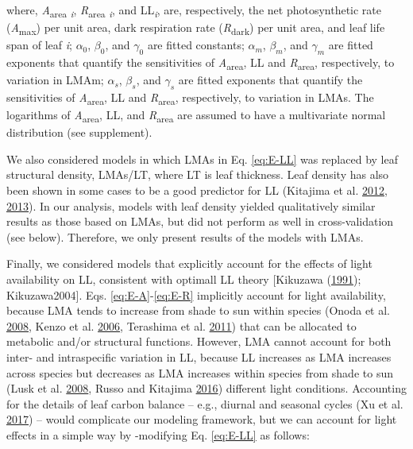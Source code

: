\documentclass[
  12pt,
]{article}
\begin{document}
where, \emph{A}\textsubscript{area} \textsubscript{\emph{i}}, \emph{R}\textsubscript{area} \textsubscript{\emph{i}}, and LL\textsubscript{\emph{i}}, are, respectively, the net photosynthetic rate (\emph{A}\textsubscript{max}) per unit area, dark respiration rate (\emph{R}\textsubscript{dark}) per unit area, and leaf life span of leaf \emph{i}; \(\alpha_0\), \(\beta_0\), and \(\gamma_0\) are fitted constants; \(\alpha_m\), \(\beta_m\), and \(\gamma_m\) are fitted exponents that quantify the sensitivities of \emph{A}\textsubscript{area}, LL and \emph{R}\textsubscript{area}, respectively, to variation in LMAm; \(\alpha_s\), \(\beta_s\), and \(\gamma_s\) are fitted exponents that quantify the sensitivities of \emph{A}\textsubscript{area}, LL and \emph{R}\textsubscript{area}, respectively, to variation in LMAs.
The logarithms of \emph{A}\textsubscript{area}, LL, and \emph{R}\textsubscript{area} are assumed to have a multivariate normal distribution (see supplement).

We also considered models in which LMAs in Eq. \eqref{eq:E-LL} was replaced by leaf structural density, LMAs/LT, where LT is leaf thickness.
Leaf density has also been shown in some cases to be a good predictor for LL (Kitajima et al. \protect\hyperlink{ref-Kitajima2012}{2012}, \protect\hyperlink{ref-Kitajima2013}{2013}).
In our analysis, models with leaf density yielded qualitatively similar results as those based on LMAs, but did not perform as well in cross-validation (see below).
Therefore, we only present results of the models with LMAs.

Finally, we considered models that explicitly account for the effects of light availability on LL, consistent with optimall LL theory {[}Kikuzawa (\protect\hyperlink{ref-Kikuzawa1991}{1991}); Kikuzawa2004{]}.
Eqs. \eqref{eq:E-A}-\eqref{eq:E-R} implicitly account for light availability, because LMA tends to increase from shade to sun within species (Onoda et al. \protect\hyperlink{ref-Onoda2008}{2008}, Kenzo et al. \protect\hyperlink{ref-Kenzo2006}{2006}, Terashima et al. \protect\hyperlink{ref-Terashima2011}{2011}) that can be allocated to metabolic and/or structural functions.
However, LMA cannot account for both inter- and intraspecific variation in LL, because LL increases as LMA increases across species but decreases as LMA increases within species from shade to sun (Lusk et al. \protect\hyperlink{ref-Lusk2008}{2008}, Russo and Kitajima \protect\hyperlink{ref-Russo2016}{2016}) different light conditions.
Accounting for the details of leaf carbon balance -- e.g., diurnal and seasonal cycles (Xu et al. \protect\hyperlink{ref-Xu2017}{2017}) -- would complicate our modeling framework, but we can account for light effects in a simple way by -modifying Eq. \eqref{eq:E-LL} as follows:
\end{document}
